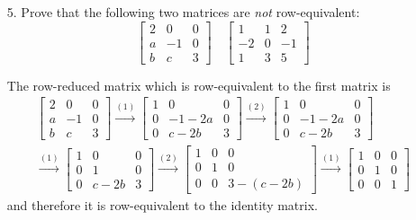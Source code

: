 \documentclass{article}
\begin{document}
\begin{enumerate}[listparindent=\parindent]
\item[5.] Prove that the following two matrices are \textit{not} row-equivalent:
    \[
        \begin{bmatrix}
            2 & 0 & 0 \\
            a & -1 & 0 \\
            b & c & 3
        \end{bmatrix}
        \quad
        \begin{bmatrix}
            1 & 1 & 2 \\
            -2 & 0 & -1 \\
            1 & 3 & 5
        \end{bmatrix}
    \]

The row-reduced matrix which is row-equivalent to the first matrix is
\begin{gather*}
    \begin{bmatrix}
        2 & 0 & 0 \\
        a & -1 & 0 \\
        b & c & 3
    \end{bmatrix}
    \xrightarrow{(1)}
    \begin{bmatrix}
        1 & 0 & 0 \\
        0 & -1 - 2a & 0 \\
        0 & c - 2b & 3
    \end{bmatrix}
    \xrightarrow{(2)}
    \begin{bmatrix}
        1 & 0 & 0 \\
        0 & -1 - 2a & 0 \\
        0 & c - 2b & 3
    \end{bmatrix}
    \\
    \xrightarrow{(1)}
    \begin{bmatrix}
        1 & 0 & 0 \\
        0 & 1 & 0 \\
        0 & c - 2b & 3
    \end{bmatrix}
    \xrightarrow{(2)}
    \begin{bmatrix}
        1 & 0 & 0 \\
        0 & 1 & 0 \\
        0 & 0 & 3 - (c - 2b)
    \end{bmatrix}
    \xrightarrow{(1)}
    \boxed{
        \begin{bmatrix}
            1 & 0 & 0 \\
            0 & 1 & 0 \\
            0 & 0 & 1
        \end{bmatrix}
    }
\end{gather*}
and therefore it is row-equivalent to the identity matrix.


\end{enumerate}
\end{document}
